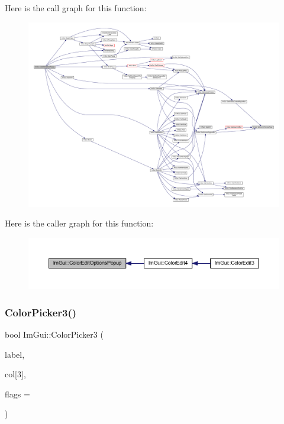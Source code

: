 Here is the call graph for this function\+:
\nopagebreak
\begin{figure}[H]
\begin{center}
\leavevmode
\includegraphics[width=350pt]{namespace_im_gui_a6bfb117816d669f8704e5d0c0c0795fe_cgraph}
\end{center}
\end{figure}
Here is the caller graph for this function\+:
\nopagebreak
\begin{figure}[H]
\begin{center}
\leavevmode
\includegraphics[width=350pt]{namespace_im_gui_a6bfb117816d669f8704e5d0c0c0795fe_icgraph}
\end{center}
\end{figure}
\mbox{\label{namespace_im_gui_a2a2a98cb9a17b18702be6b954670b388}} 
\subsubsection{\texorpdfstring{Color\+Picker3()}{ColorPicker3()}}
{\footnotesize\ttfamily bool Im\+Gui\+::\+Color\+Picker3 (\begin{DoxyParamCaption}\item[{const char $\ast$}]{label,  }\item[{float}]{col\mbox{[}3\mbox{]},  }\item[{\mbox{\hyperlink{imgui_8h_a6b2d5e95adc38f22c021252189f669c6}{Im\+Gui\+Color\+Edit\+Flags}}}]{flags = {} }\end{DoxyParamCaption})}


